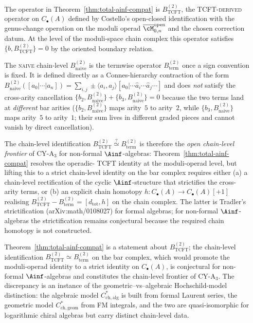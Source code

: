 \begin{remark}
\label{rem:tcft-vs-naive-b2}
The operator in Theorem~\ref{thm:total-ainf-compat} is
$B^{(2)}_{\mathrm{TCFT}}$, the \textsc{TCFT-derived} operator on
$C_\bullet(A)$ defined by Costello's open-closed identification
with the genus-change operation on the moduli operad
$\overline{\cM}_{0,n}^{\mathrm{open}}$ and the chosen correction
datum. At the level of the moduli-space chain complex this
operator satisfies $\{b, B^{(2)}_{\mathrm{TCFT}}\}=0$ by the
oriented boundary relation.

The \textsc{naive} chain-level $B^{(2)}_{\mathrm{naive}}$ is
the termwise operator $B^{(2)}_{\mathrm{term}}$ once a sign
convention is fixed. It is defined directly as a Connes-hierarchy
contraction of the form
$B^{(2)}_{\mathrm{naive}}([a_0 | \cdots | a_n]) = \sum_{i,j} \pm \langle a_i,
a_j \rangle [a_0 | \cdots \hat{a}_i \cdots \hat{a}_j \cdots]$
and does
\emph{not} satisfy the cross-arity cancellation
$\{b_2, B^{(2)}_{\mathrm{naive}}\} + \{b_3, B^{(2)}_{\mathrm{naive}}\} = 0$
because the two terms land at \emph{different} bar arities
\textup{(}$\{b_2, B^{(2)}_{\mathrm{naive}}\}$ maps arity~$5$ to arity~$2$,
while $\{b_3, B^{(2)}_{\mathrm{naive}}\}$ maps arity~$5$ to arity~$1$;
their sum lives in different graded pieces and cannot vanish by direct
cancellation\textup{).}

The chain-level identification
$B^{(2)}_{\mathrm{TCFT}} \overset{?}{\simeq} B^{(2)}_{\mathrm{term}}$
is therefore the \emph{open chain-level frontier} of CY-A$_3$ for non-formal
$\Ainf$-algebras: Theorem~\ref{thm:total-ainf-compat} resolves the operadic-
TCFT identity at the moduli-operad level, but lifting this to a strict
chain-level identity on the bar complex requires either
\textup{(}a\textup{)} a chain-level rectification of the cyclic
$\Ainf$-structure that strictifies the cross-arity terms, or
\textup{(}b\textup{)} an explicit chain homotopy
$h \colon C_\bullet(A) \to C_\bullet(A)[+1]$ realising
$B^{(2)}_{\mathrm{TCFT}} - B^{(2)}_{\mathrm{term}} = [d_{\mathrm{tot}}, h]$
on the chain complex. The latter is Tradler's strictification
\textup{(}arXiv:math/0108027\textup{)} for formal algebras; for non-formal
$\Ainf$-algebras the strictification remains conjectural because the
required chain homotopy is not constructed.

Theorem~\ref{thm:total-ainf-compat} is a statement about
$B^{(2)}_{\mathrm{TCFT}}$; the chain-level identification
$B^{(2)}_{\mathrm{TCFT}} \simeq B^{(2)}_{\mathrm{term}}$ on the
bar complex, which would promote the moduli-operad identity to a
strict identity on $C_\bullet(A)$, is conjectural for non-formal
$\Ainf$-algebras and constitutes the chain-level frontier of
CY-A$_3$. The discrepancy is an instance of the
geometric--vs--algebraic Hochschild-model distinction: the
algebraic model $C^*_{\mathrm{ch,alg}}$ is built from formal
Laurent series, the geometric model $C^*_{\mathrm{ch,geom}}$ from
FM integrals, and the two are quasi-isomorphic for logarithmic
chiral algebras but carry distinct chain-level data.
\end{remark}


